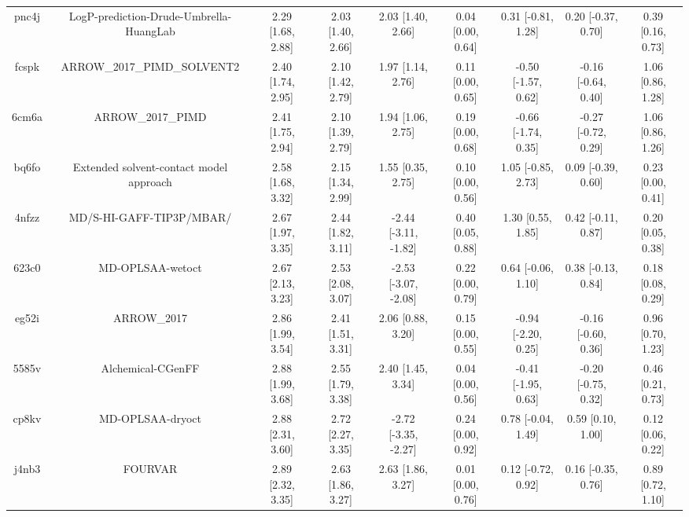 \documentclass{article}
\begin{document}
\begin{center}
\begin{longtable}{|ccccccccc|}
 pnc4j &            LogP-prediction-Drude-Umbrella-HuangLab &  2.29 [1.68, 2.88] &  2.03 [1.40, 2.66] &     2.03 [1.40, 2.66] &  0.04 [0.00, 0.64] &   0.31 [-0.81, 1.28] &   0.20 [-0.37, 0.70] &     0.39 [0.16, 0.73] \\
 fcspk &                        ARROW\_2017\_PIMD\_SOLVENT2 &  2.40 [1.74, 2.95] &  2.10 [1.42, 2.79] &     1.97 [1.14, 2.76] &  0.11 [0.00, 0.65] &  -0.50 [-1.57, 0.62] &  -0.16 [-0.64, 0.40] &     1.06 [0.86, 1.28] \\
 6cm6a &                                  ARROW\_2017\_PIMD &  2.41 [1.75, 2.94] &  2.10 [1.39, 2.79] &     1.94 [1.06, 2.75] &  0.19 [0.00, 0.68] &  -0.66 [-1.74, 0.35] &  -0.27 [-0.72, 0.29] &     1.06 [0.86, 1.26] \\
 bq6fo &            Extended solvent-contact model approach &  2.58 [1.68, 3.32] &  2.15 [1.34, 2.99] &     1.55 [0.35, 2.75] &  0.10 [0.00, 0.56] &   1.05 [-0.85, 2.73] &   0.09 [-0.39, 0.60] &     0.23 [0.00, 0.41] \\
 4nfzz &                           MD/S-HI-GAFF-TIP3P/MBAR/ &  2.67 [1.97, 3.35] &  2.44 [1.82, 3.11] &  -2.44 [-3.11, -1.82] &  0.40 [0.05, 0.88] &    1.30 [0.55, 1.85] &   0.42 [-0.11, 0.87] &     0.20 [0.05, 0.38] \\
 623c0 &                                   MD-OPLSAA-wetoct &  2.67 [2.13, 3.23] &  2.53 [2.08, 3.07] &  -2.53 [-3.07, -2.08] &  0.22 [0.00, 0.79] &   0.64 [-0.06, 1.10] &   0.38 [-0.13, 0.84] &     0.18 [0.08, 0.29] \\
 eg52i &                                        ARROW\_2017 &  2.86 [1.99, 3.54] &  2.41 [1.51, 3.31] &     2.06 [0.88, 3.20] &  0.15 [0.00, 0.55] &  -0.94 [-2.20, 0.25] &  -0.16 [-0.60, 0.36] &     0.96 [0.70, 1.23] \\
 5585v &                                  Alchemical-CGenFF &  2.88 [1.99, 3.68] &  2.55 [1.79, 3.38] &     2.40 [1.45, 3.34] &  0.04 [0.00, 0.56] &  -0.41 [-1.95, 0.63] &  -0.20 [-0.75, 0.32] &     0.46 [0.21, 0.73] \\
 cp8kv &                                   MD-OPLSAA-dryoct &  2.88 [2.31, 3.60] &  2.72 [2.27, 3.35] &  -2.72 [-3.35, -2.27] &  0.24 [0.00, 0.92] &   0.78 [-0.04, 1.49] &    0.59 [0.10, 1.00] &     0.12 [0.06, 0.22] \\
 j4nb3 &                                            FOURVAR &  2.89 [2.32, 3.35] &  2.63 [1.86, 3.27] &     2.63 [1.86, 3.27] &  0.01 [0.00, 0.76] &   0.12 [-0.72, 0.92] &   0.16 [-0.35, 0.76] &     0.89 [0.72, 1.10] \\

\end{longtable}
\end{center}
\end{document}
